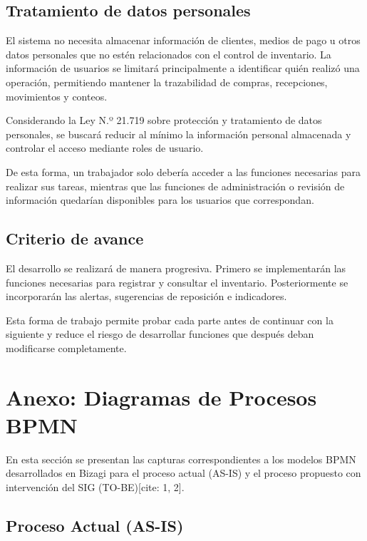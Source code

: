 \documentclass[11pt,letterpaper]{article}
\begin{document}
\subsection{Tratamiento de datos personales}

El sistema no necesita almacenar información de clientes, medios de pago u otros datos personales que no estén relacionados con el control de inventario. La información de usuarios se limitará principalmente a identificar quién realizó una operación, permitiendo mantener la trazabilidad de compras, recepciones, movimientos y conteos.

Considerando la Ley N.º 21.719 sobre protección y tratamiento de datos personales, se buscará reducir al mínimo la información personal almacenada y controlar el acceso mediante roles de usuario.

De esta forma, un trabajador solo debería acceder a las funciones necesarias para realizar sus tareas, mientras que las funciones de administración o revisión de información quedarían disponibles para los usuarios que correspondan.

\subsection{Criterio de avance}

El desarrollo se realizará de manera progresiva. Primero se implementarán las funciones necesarias para registrar y consultar el inventario. Posteriormente se incorporarán las alertas, sugerencias de reposición e indicadores.

Esta forma de trabajo permite probar cada parte antes de continuar con la siguiente y reduce el riesgo de desarrollar funciones que después deban modificarse completamente.

\newpage
\appendix

\section{Anexo: Diagramas de Procesos BPMN}

En esta sección se presentan las capturas correspondientes a los modelos BPMN desarrollados en Bizagi para el proceso actual (AS-IS) y el proceso propuesto con intervención del SIG (TO-BE)[cite: 1, 2].

\subsection{Proceso Actual (AS-IS)}
\end{document}
